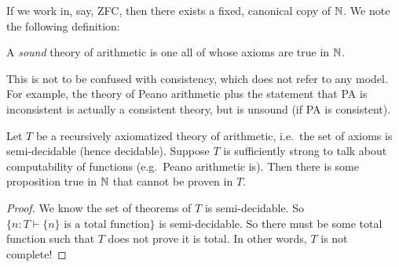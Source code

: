 \documentclass[a4paper]{article}
\newcommand\cif{{\color{blue} \mathsf{if}\;}}
\newcommand\cthen{{\color{blue}\;\mathsf{then}\;}}
\newcommand\celse{{\color{blue}\;\mathsf{else}\;}}
\begin{document}
If we work in, say, ZFC, then there exists a fixed, canonical copy of $\mathbb{N}$. We note the following definition:
\begin{defi}
  A \emph{sound} theory of arithmetic is one all of whose axioms are true in $\mathbb{N}$.
\end{defi}
This is not to be confused with consistency, which does not refer to any model. For example, the theory of Peano arithmetic plus the statement that PA is inconsistent is actually a consistent theory, but is unsound (if PA is consistent).

\begin{thm}
  Let $T$ be a recursively axiomatized theory of arithmetic, i.e.\ the set of axioms is semi-decidable (hence decidable). Suppose $T$ is sufficiently strong to talk about computability of functions (e.g.\ Peano arithmetic is). Then there is some proposition true in $\mathbb{N}$ that cannot be proven in $T$.
\end{thm}

\begin{proof}
  We know the set of theorems of $T$ is semi-decidable. So $\{n: T \vdash \{n\}\text{ is a total function}\}$ is semi-decidable. So there must be some total function such that $T$ does not prove it is total. In other words, $T$ is not complete!
\end{proof}



\end{document}
